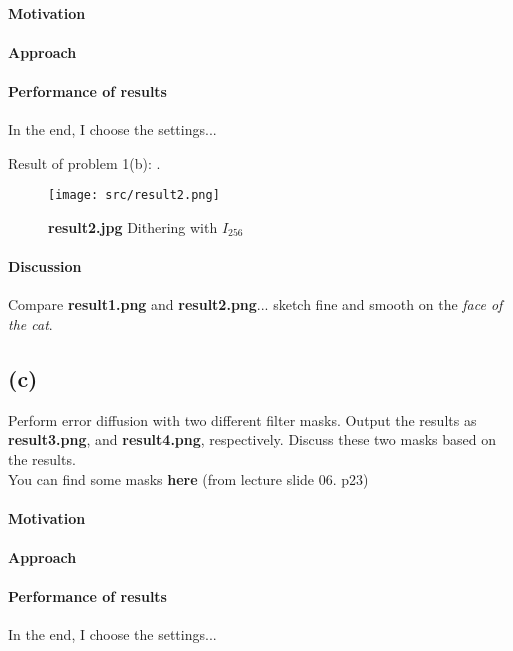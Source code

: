 \paragraph{Motivation}

\paragraph{Approach}

\paragraph{Performance of results}
In the end, I choose the \alert{settings}...

Result of problem 1(b): .
\begin{figure}
    \centering
    \texttt{[image: src/result2.png]}
    \caption{\textbf{result2.jpg} Dithering with \(I_{256}\)}
    \label{result2}
\end{figure}

\paragraph{Discussion}
Compare \textbf{result1.png} and \textbf{result2.png}...
 sketch fine and smooth on the \textit{face of the cat}.

\subsection{(c)}\label{1_c}
Perform error diffusion with two different filter masks. Output the results as \textbf{result3.png}, and \textbf{result4.png}, respectively. Discuss these two masks based on the results. \\
You can find some masks \textbf{here} (from lecture slide 06. p23)

\paragraph{Motivation}

\paragraph{Approach}

\paragraph{Performance of results}
In the end, I choose the \alert{settings}...

